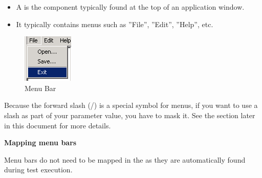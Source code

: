 \begin{itemize}
\item A  is the component typically 
found at the top of an application window.
\item It typically contains menus such as  ''File'', ''Edit'',
  ''Help'', etc.
\end{itemize}

\begin{figure}
\begin{center}
\includegraphics{PS/Menu}
\caption{Menu Bar}
\label{menu}
\end{center}
\end{figure}

Because the forward slash (/) is a special symbol for menus, if you want to use a slash as part of your parameter value, you have to mask it. See the section later in this document  for more details. 

\textbf{Mapping menu bars}

Menu bars do not need to be mapped in the \gdomm{} as they are automatically found during test execution.

